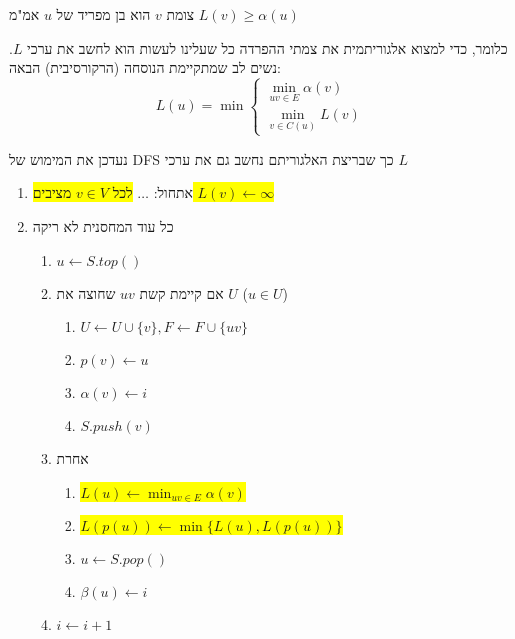 \begin{observation}
צומת $v$ הוא בן מפריד של $u$ אמ"מ
$L(v) \ge \alpha(u)$
\end{observation}

כלומר, כדי למצוא אלגוריתמית את צמתי ההפרדה כל שעלינו לעשות הוא לחשב את ערכי $L$.
נשים לב  שמתקיימת הנוסחה (הרקורסיבית) הבאה:
$$
L(u) = \min
\begin{cases}
\displaystyle\min_{uv \in E} \alpha(v)
\\
\displaystyle\min_{v \in C(u)} L(v)
\end{cases}
$$




\newpage
נעדכן את המימוש של DFS כך שבריצת האלגוריתם נחשב גם את ערכי $L$
\begin{enumerate}
\item
אתחול:
$\ldots$
\colorbox{yellow}{
לכל 
$v \in V$
מציבים
$L(v) \leftarrow \infty$
}
\item
כל עוד המחסנית לא ריקה
\begin{enumerate}
	\item
	$u \leftarrow S.top()$
	\item 
	אם קיימת קשת 
	$uv$
	שחוצה את $U$ 
	($u \in U$)
		\begin{enumerate}
		\item
		$U \leftarrow U \cup \{v\}, F \leftarrow F \cup \{uv\}$
		\item
		$p(v) \leftarrow u$
		\item
		$\alpha(v) \leftarrow i$
		\item
		$S.push(v)$
		\end{enumerate}
	\item
	אחרת 
	\begin{enumerate}
		\item 
		\colorbox{yellow}{$L(u) \leftarrow \displaystyle\min_{uv \in E} \alpha(v)$}
		\item \colorbox{yellow}{$L(p(u)) \leftarrow \min\{L(u), L(p(u))\}$}
		\item $u \leftarrow S.pop()$
		\item $\beta(u) \leftarrow i$
	\end{enumerate}
	\item
	$i \leftarrow i + 1$
	\end{enumerate}
\end{enumerate}

